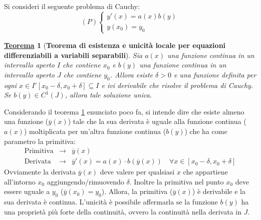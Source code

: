 \documentclass[a4paper]{article}
\newtheorem{theorem}{\textcolor{Red3}{\underline{Teorema}}}
\begin{document}
	\noindent
	Si consideri il seguente problema di Cauchy:
	\begin{equation*}
		(P)\begin{cases}
			y'\left(x\right) = a\left(x\right) b\left(y\right) \\
			y\left(x_{0}\right) = y_{0}
		\end{cases}
	\end{equation*}
	\begin{theorem}[\textbf{Teorema di esistenza e unicità locale per equazioni differenziabili a variabili separabili}]\label{theorem: teorema di esistenza e unicità locale per equazioni differenziabili a variabili separabili}
		Sia $a\left(x\right)$ una funzione continua in un intervallo aperto $I$ che contiene $x_{0}$ e $b\left(y\right)$ una funzione continua in un intervallo aperto $J$ che contiene $y_{0}$. Allora esiste $\delta > 0$ e una funzione definita per ogni $x \in I' \left[x_{0} - \delta, x_{0} + \delta\right] \subseteq I$ e ivi derivabile che risolve il problema di Cauchy. Se $b\left(y\right) \in C^{1}\left(J\right)$, allora tale soluzione unica.
	\end{theorem}

	\noindent
	Considerando il teorema \ref{theorem: teorema di esistenza e unicità locale per equazioni differenziabili a variabili separabili} enunciato poco fa, si intende dire che esiste almeno una funzione ($\overline{y}\left(x\right)$) tale che la sua derivata è uguale alla funzione continua ($a\left(x\right)$) moltiplicata per un'altra funzione continua ($b\left(y\right)$) che ha come parametro la primitiva:
	\begin{equation*}
		\begin{array}{rcl}
			\text{Primitiva} 	&\longrightarrow& \overline{y}\left(x\right) \\
			\text{Derivata}		&\longrightarrow& \overline{y}'\left(x\right) = a\left(x\right) \cdot b\left(\overline{y}\left(x\right)\right) \hspace{1em} \forall x \in \left[x_{0} - \delta, x_{0} + \delta \right]
		\end{array}
	\end{equation*}
	Ovviamente la derivata $\overline{y}\left(x\right)$ deve valere per qualsiasi $x$ che appartiene all'intorno $x_{0}$ aggiungendo/rimuovendo $\delta$. Inoltre la primitiva nel punto $x_{0}$ deve essere uguale a $y_{0}$ ($\overline{y}\left(x_{0}\right) = y_{0}$). Allora, la primitiva ($\overline{y}\left(x\right)$) è derivabile e la sua derivata è continua. L'unicità è possibile affermarla se la funzione $b\left(y\right)$ ha una proprietà più forte della continuità, ovvero la continuità nella derivata in $J$.
\end{document}
